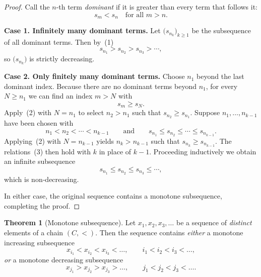 \documentclass[12pt]{article}
\theoremstyle{definition} %
\newtheorem{theorem}{Theorem}
\theoremstyle{plain} %
\begin{document}
  \begin{proof}
  Call the \(n\)-th term \emph{dominant} if it is greater than every term
  that follows it:
  \[
     s_m < s_n \quad\text{for all } m>n. \tag{1}
  \]
  
  \textbf{Case 1.  Infinitely many dominant terms.}
  Let \(\bigl(s_{n_k}\bigr)_{k\ge1}\) be the subsequence of all dominant
  terms.  Then by~(1)
  \[
     s_{n_1} > s_{n_2} > s_{n_3} > \cdots,
  \]
  so \(\bigl(s_{n_k}\bigr)\) is strictly decreasing.
  
  \medskip
  \textbf{Case 2.  Only finitely many dominant terms.}
  Choose \(n_1\) beyond the last dominant index.  Because
  there are no dominant terms beyond \(n_1\), for every \(N\ge n_1\) we can find
  an index \(m>N\) with
  \[
     s_m \ge s_N. \tag{2}
  \]
  Apply~(2) with \(N=n_1\) to select \(n_2>n_1\) such that
  \(s_{n_2}\ge s_{n_1}\).  Suppose \(n_1,\dots,n_{k-1}\) have been chosen with
  \[
     n_1 < n_2 < \cdots < n_{k-1} \qquad\text{and}\qquad
     s_{n_1} \le s_{n_2} \le \cdots \le s_{n_{k-1}}. \tag{3}
  \]
  Applying~(2) with \(N=n_{k-1}\) yields \(n_k>n_{k-1}\) such that
  \(s_{n_k}\ge s_{n_{k-1}}\).  The relations~(3) then hold with \(k\) in place
  of \(k-1\).  Proceeding inductively we obtain an infinite subsequence
  \[
     s_{n_1} \le s_{n_2} \le s_{n_3} \le \cdots,
  \]
  which is non‑decreasing.
  
  \medskip
  In either case, the original sequence contains a monotone subsequence,
  completing the proof.
  \end{proof}

\begin{theorem}[Monotone subsequence]\label{thm:monotone_subseq}
  Let $x_1,x_2,x_3,\dots$ be a sequence of \emph{distinct} elements of a
  chain $(C,<)$.  Then the sequence contains
  \emph{either} a monotone increasing subsequence
  \[
      x_{i_1}<x_{i_2}<x_{i_3}<\dots,
      \qquad i_1<i_2<i_3<\dots,
  \]
  \emph{or} a monotone decreasing subsequence
  \[
      x_{j_1}>x_{j_2}>x_{j_3}>\dots,
      \qquad j_1<j_2<j_3<\dots.
  \]
\end{theorem}
\end{document}
